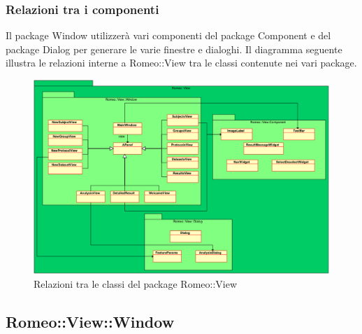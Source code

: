 		\subsubsection{Relazioni tra i componenti}	
		Il package\g{} Window utilizzerà vari componenti del package\g{} Component e del package\g{} Dialog per generare le varie finestre e dialoghi. Il diagramma seguente illustra le relazioni interne a Romeo::View tra le classi contenute nei vari package\g{}.
		\begin{figure}[!h]
			\centering
			\includegraphics[width=1.1\linewidth]{./Content/Immagini/RelazioniView.png}
			\caption{Relazioni tra le classi del package Romeo::View}
			\label{Relview}
		\end{figure}
	\linebreak
	\pagebreak
	
		
	\subsection{Romeo::View::Window}
	\label{romeo::view::window}
